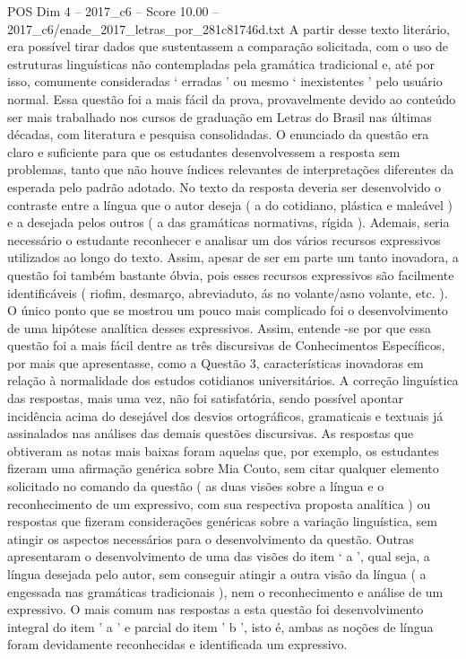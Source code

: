 \begin{textsample}{POS Dim 4 – 2017\_c6 – Score 10.00 – 2017\_c6/enade\_2017\_letras\_por\_281c81746d.txt}
A partir desse texto literário, era possível tirar dados que sustentassem a comparação solicitada, com o uso de estruturas linguísticas não contempladas pela gramática tradicional e, até por isso, comumente consideradas ‘ erradas ’ ou mesmo ‘ inexistentes ’ pelo usuário normal.
Essa questão foi a mais fácil da prova, provavelmente devido ao conteúdo ser mais trabalhado nos cursos de graduação em Letras do Brasil nas últimas décadas, com literatura e pesquisa consolidadas.
O enunciado da questão era claro e suficiente para que os estudantes desenvolvessem a resposta sem problemas, tanto que não houve índices relevantes de interpretações diferentes da esperada pelo padrão adotado.
No texto da resposta deveria ser desenvolvido o contraste entre a língua que o autor deseja ( a do cotidiano, plástica e maleável ) e a desejada pelos outros ( a das gramáticas normativas, rígida ).
Ademais, seria necessário o estudante reconhecer e analisar um dos vários recursos expressivos utilizados ao longo do texto.
Assim, apesar de ser em parte um tanto inovadora, a questão foi também bastante óbvia, pois esses recursos expressivos são facilmente identificáveis ( riofim, desmarço, abreviaduto, ás no volante/asno volante, etc. ).
O único ponto que se mostrou um pouco mais complicado foi o desenvolvimento de uma hipótese analítica desses expressivos.
Assim, entende -se por que essa questão foi a mais fácil dentre as três discursivas de Conhecimentos Específicos, por mais que apresentasse, como a Questão 3, características inovadoras em relação à normalidade dos estudos cotidianos universitários.
A correção linguística das respostas, mais uma vez, não foi satisfatória, sendo possível apontar incidência acima do desejável dos desvios ortográficos, gramaticais e textuais já assinalados nas análises das demais questões discursivas.
As respostas que obtiveram as notas mais baixas foram aquelas que, por exemplo, os estudantes fizeram uma afirmação genérica sobre Mia Couto, sem citar qualquer elemento solicitado no comando da questão ( as duas visões sobre a língua e o reconhecimento de um expressivo, com sua respectiva proposta analítica ) ou respostas que fizeram considerações genéricas sobre a variação linguística, sem atingir os aspectos necessários para o desenvolvimento da questão.
Outras apresentaram o desenvolvimento de uma das visões do item ‘ a ’, qual seja, a língua desejada pelo autor, sem conseguir atingir a outra visão da língua ( a engessada nas gramáticas tradicionais ), nem o reconhecimento e análise de um expressivo.
O mais comum nas respostas a esta questão foi desenvolvimento integral do item ' a ' e parcial do item ' b ', isto é, ambas as noções de língua foram devidamente reconhecidas e identificada um expressivo.

\end{textsample}
